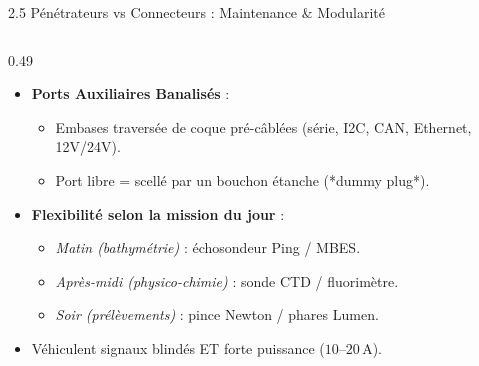 \begin{frame}{2.5 Pénétrateurs vs Connecteurs : Maintenance \& Modularité}
\begin{columns}[T]
    \begin{column}{0.49\textwidth}
      \begin{block}{}
        \scriptsize
        \begin{itemize}
          \item \textbf{Ports Auxiliaires Banalisés} :
            \begin{itemize}\tiny
              \item Embases traversée de coque pré-câblées (série, I2C, CAN, Ethernet, 12V/24V).
              \item Port libre = scellé par un bouchon étanche (*dummy plug*).
            \end{itemize}
          \item \textbf{Flexibilité selon la mission du jour} :
            \begin{itemize}\tiny
              \item \textit{Matin (bathymétrie)} : échosondeur Ping / MBES.
              \item \textit{Après-midi (physico-chimie)} : sonde CTD / fluorimètre.
              \item \textit{Soir (prélèvements)} : pince Newton / phares Lumen.
            \end{itemize}
          \item Véhiculent signaux blindés ET forte puissance ($10\text{--}20\,\text{A}$).
        \end{itemize}
      \end{block}
    \end{column}
  \end{columns}
\end{frame}


